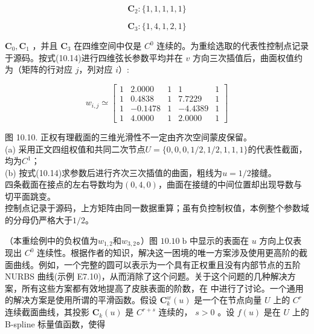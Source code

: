 \documentclass[../main.tex]{subfiles}
\begin{document}
\[
{\mathbf{C}}_{2} : \{ 1,1,1,1,1\}
\]

\[
{\mathbf{C}}_{3} : \{ 1,4,1,2,1\}
\]

\({\mathbf{C}}_{0},{\mathbf{C}}_{1}\) ，并且 \({\mathbf{C}}_{3}\) 在四维空间中仅是 \({C}^{0}\) 连续的。为重绘选取的代表性控制点记录于源码。按式(10.14)进行四维弦长参数平均并在 \(v\) 方向三次插值后，曲面权值约为（矩阵的行对应 \(j\)，列对应 \(i\)）:

\[
{w}_{i,j}\simeq\left[\begin{matrix}1 & 2.0000 & 1 & 1 & 1 \\ 1 & 0.4838 & 1 & 7.7229 & 1 \\ 1 & -0.1478 & 1 & -4.4389 & 1 \\ 1 & 4.0000 & 1 & 2.0000 & 1\end{matrix}\right]
\]

\begin{center}
\begin{minipage}{37cm}
\vspace*{.6\baselineskip}
\centering
{}
\par\smallskip
图 10.10. 正权有理截面的三维光滑性不一定由齐次空间蒙皮保留。\\
(a) 采用正文四组权值和共同二次节点$U=\{0,0,0,1/2,1/2,1,1,1\}$的代表性截面，均为$C^1$；\\
(b) 按式(10.14)求参数后进行齐次三次插值的曲面，粗线为$u=1/2$接缝。\\
四条截面在接点的左右导数均为$(0,4,0)$，曲面在接缝的中间位置却出现导数与切平面跳变。\\
控制点记录于源码，上方矩阵由同一数据重算；虽有负控制权值，本例整个参数域的分母仍严格大于$1/2$。
\end{minipage}
\end{center}

（本重绘例中的负权值为$w_{1,2}$和$w_{3,2}$。）图 \({10.10}\mathrm{\;b}\) 中显示的表面在 \(u\) 方向上仅表现出 \({C}^{0}\) 连续性。根据作者的知识，解决这一困境的唯一方案涉及使用更高阶的截面曲线。例如，一个完整的圆可以表示为一个具有正权重且没有内部节点的五阶 NURBS 曲线(示例 E7.10)，从而消除了这个问题。关于这个问题的几种解决方案，所有这些方案都有效地提高了皮肤表面的阶数，在 \cite{Hohm91} 中进行了讨论。一个通用的解决方案是使用所谓的平滑函数。假设 \({\mathbf{C}}_{k}^{w}\left( u\right)\) 是一个在节点向量 \(U\) 上的 \({C}^{r}\) 连续截面曲线，其投影 \({\mathbf{C}}_{k}\left( u\right)\) 是 \({C}^{r + s}\) 连续的， \(s > 0\) 。设 \(f\left( u\right)\) 是在 \(U\) 上的 B-spline 标量值函数，使得
\end{document}
